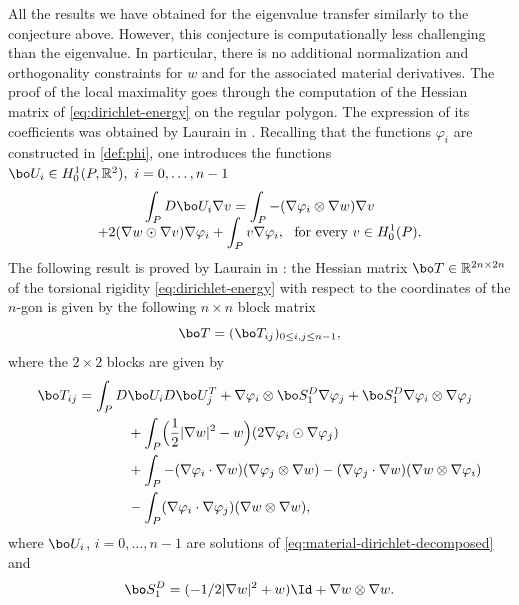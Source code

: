 \begin{rem}
All the results we have obtained for the eigenvalue transfer similarly to the conjecture above. However, this conjecture is computationally less challenging than the eigenvalue. In particular, there is no additional normalization and orthogonality constraints for $w$ and for the associated material derivatives. The proof of the local maximality goes through the computation of the Hessian matrix of \eqref{eq:dirichlet-energy} on the regular polygon. The expression of its coefficients was obtained by Laurain in \cite{laurain2ndDeriv}.
Recalling that the functions $\varphi_i$ are constructed in \eqref{def:phi},
one introduces the functions $\bo U_i \in H_0^1(P,\Bbb{R}^2),\ i=0,\dots,n-1$
\vspace*{-5pt}
\begin{multline}
\int_P D\bo U_i \nabla v
= \int_P -(\nabla \varphi_i \otimes \nabla w)\nabla v\\[-8pt]
+ 2 (\nabla w \odot \nabla v)\nabla \varphi_i + \int_P v \nabla \varphi_i,\ \text{ for every } v \in H_0^1(P).
\label{eq:material-dirichlet-decomposed}
\end{multline}
The following result is proved by Laurain in \cite[Prop.\,14]{laurain2ndDeriv}: the Hessian matrix $\bo T \in \Bbb{R}^{2n\times 2n}$ of the torsional rigidity \eqref{eq:dirichlet-energy} with respect to the coordinates of the $n$-gon is given by the following $n\times n$ block matrix
\[
\bo T = (\bo T_{ij})_{0\leq i,j\leq n-1},
\]
where the $2\times 2$ blocks are given by
\begin{equation}
\label{eq:Hessian-Dir-block}
\begin{aligned}
\bo T_{ij} = \int_P D&\bo U_i D\bo U_j^T + \nabla \varphi_i \otimes \bo S_1^D \nabla \varphi_j + \bo S_1^D \nabla \varphi_i \otimes \nabla \varphi_j \\
& +\int_P \Bigl(\frac{1}{2}|\nabla w|^2 - w\Bigr) (2 \nabla \varphi_i \odot \nabla \varphi_j) \\
& +\int_P-(\nabla \varphi_i\cdot \nabla w)(\nabla \varphi_j \otimes \nabla w)-(\nabla \varphi_j \cdot \nabla w)(\nabla w \otimes \nabla \varphi_i) \\
&-\int_P(\nabla \varphi_i \cdot \nabla \varphi_j)(\nabla w \otimes \nabla w),
\end{aligned}
\end{equation}
where $\bo U_i$, $i=0,\dots,n-1$ are solutions of \eqref{eq:material-dirichlet-decomposed} and
\[
\bo S_1^D = (-1/2|\nabla w|^2 +w)\Id +\nabla w \otimes \nabla w.
\]
\end{rem}

